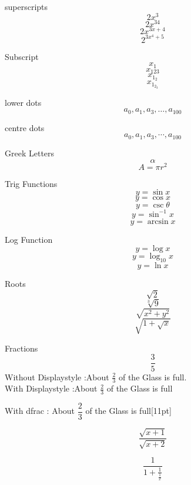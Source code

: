\documentclass[18]{article}
\begin{document}
superscripts $${2x^3}$$
$${2x^{34}}$$
$${2x^{3x+4}}$$
$${2^{3x^4+5}}$$

Subscript
$$x_1$$
$${x_{123}}$$
$${x_{1_2}}$$
$${x_{1_{2_3}}}$$

lower dots
$${a_0,a_1,a_3,\ldots,a_{100}}$$

centre dots
$${a_0,a_1,a_3,\cdots,a_{100}}$$

Greek Letters
$$\alpha$$
$$A=\pi r^2$$

Trig Functions
$$y=\sin x$$
$$y=\cos x$$
$$y=\csc \theta$$
$$y=\sin^{-1}x $$
$$y=\arcsin x$$

Log Function
$$y=\log x$$
$$y=\log_{10} x$$
$$y=\ln x$$

Roots
$$\sqrt{2}$$
$$\sqrt[3]{9}$$
$$\sqrt{x^2+y^2}$$
$$\sqrt{ 1+\sqrt{x}  }$$

Fractions
$$\frac{3}{5}$$
Without Displaystyle :About $\frac{2}{3}$ of the Glass is full.\\[11pt]

With Displaystyle :About $\displaystyle \frac{2}{3}$ of the Glass is full

With dfrac : About $\dfrac{2}{3}$ of the Glass is full[11pt]

$$\frac{\sqrt{x+1}}{\sqrt{x+2}}$$

$$\frac{1}{1+\frac{1}{\frac{1}{x}}}$$
\end{document}
